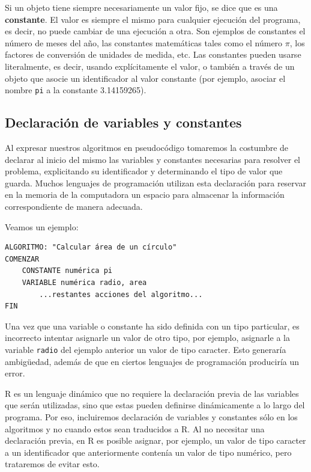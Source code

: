 \documentclass[
]{book}
\begin{document}
Si un objeto tiene siempre necesariamente un valor fijo, se dice que es una \textbf{constante}. El valor es siempre el mismo para cualquier ejecución del programa, es decir, no puede cambiar de una ejecución a otra. Son ejemplos de constantes el número de meses del año, las constantes matemáticas tales como el número \(\pi\), los factores de conversión de unidades de medida, etc. Las constantes pueden usarse literalmente, es decir, usando explícitamente el valor, o también a través de un objeto que asocie un identificador al valor constante (por ejemplo, asociar el nombre \texttt{pi} a la constante 3.14159265).

\hypertarget{declaraciuxf3n-de-variables-y-constantes}{%
\subsection{Declaración de variables y constantes}\label{declaraciuxf3n-de-variables-y-constantes}}

Al expresar nuestros algoritmos en pseudocódigo tomaremos la costumbre de declarar al inicio del mismo las variables y constantes necesarias para resolver el problema, explicitando su identificador y determinando el tipo de valor que guarda. Muchos lenguajes de programación utilizan esta declaración para reservar en la memoria de la computadora un espacio para almacenar la información correspondiente de manera adecuada.

Veamos un ejemplo:

\begin{verbatim}
ALGORITMO: "Calcular área de un círculo"
COMENZAR
    CONSTANTE numérica pi
    VARIABLE numérica radio, area
        ...restantes acciones del algoritmo...
FIN
\end{verbatim}

Una vez que una variable o constante ha sido definida con un tipo particular, es incorrecto intentar asignarle un valor de otro tipo, por ejemplo, asignarle a la variable \texttt{radio} del ejemplo anterior un valor de tipo caracter. Esto generaría ambigüedad, además de que en ciertos lenguajes de programación produciría un error.

R es un lenguaje dinámico que no requiere la declaración previa de las variables que serán utilizadas, sino que estas pueden definirse dinámicamente a lo largo del programa. Por eso, incluiremos declaración de variables y constantes sólo en los algoritmos y no cuando estos sean traducidos a R. Al no necesitar una declaración previa, en R es posible asignar, por ejemplo, un valor de tipo caracter a un identificador que anteriormente contenía un valor de tipo numérico, pero trataremos de evitar esto.
\end{document}
